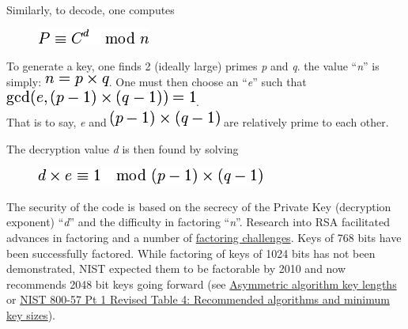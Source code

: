 Similarly, to decode, one computes

\begin{figure}[H]
\centering
\includegraphics[scale=.6]{graphics/e3a80911ae043c10931e49a6860405d6.png}
\end{figure}

To generate a key, one finds 2 (ideally large) primes \emph{p} and
\emph{q}. the value ``\emph{n}'' is simply:
\includegraphics[scale=.6]{graphics/ac0831ae3a81b290afe4473899785ca7.png}.
One must then choose an ``\emph{e}'' such that \\
\includegraphics[scale=.6]{graphics/47a50a61203b792b08a69b17c347b73f.png}. \\
That is to say, \emph{e} and
\includegraphics[scale=.6]{graphics/0725da7bdcacd1fcb101173ffeebacae.png}
are relatively prime to each other.

The decryption value \emph{d} is then found by solving

\begin{figure}[H]
\centering
\includegraphics[scale=.6]{graphics/a5e8e37e86ed379e1679034e0235bcd6.png}
\end{figure}

The security of the code is based on the secrecy of the Private Key
(decryption exponent) ``\emph{d}'' and the difficulty in factoring
``\emph{n}''. Research into RSA facilitated advances in factoring and a
number of \href{http://www.rsa.com/rsalabs/node.asp?id=2092}{factoring
challenges}. Keys of 768 bits have been successfully factored. While
factoring of keys of 1024 bits has not been demonstrated, NIST expected
them to be factorable by 2010 and now recommends 2048 bit keys going
forward (see
\href{http://en.wikipedia.org/wiki/Key\_size\#Asymmetric\_algorithm\_key\_lengths}{Asymmetric
algorithm key lengths} or
\href{http://csrc.nist.gov/publications/nistpubs/800-57/sp800-57-Part1-revised2\_Mar08-2007.pdf}{NIST
800-57 Pt 1 Revised Table 4: Recommended algorithms and minimum key
sizes}).

